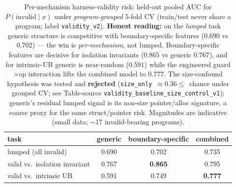 \begin{table}[t]
  \centering
  \caption{Per-mechanism harness-validity risk: held-out pooled AUC for
    $P(\mathrm{invalid}\mid x)$ under \emph{program-grouped} 5-fold CV
    (train/test never share a program; label \texttt{validity\_v2}).
    \textbf{Honest reading:} on the \emph{lumped} task generic structure is
    competitive with boundary-specific features ($0.690$ vs $0.702$) --- the
    win is \emph{per-mechanism}, not lumped. Boundary-specific features are
    decisive for isolation invariants ($0.865$ vs generic $0.767$), and for
    intrinsic-UB generic is near-random ($0.591$) while the engineered
    guard$\times$op interaction lifts the combined model to $0.777$. The
    size-confound hypothesis was tested and \textbf{rejected}
    (\texttt{size\_only}~$\approx0.36\le$~chance under grouped CV; see
    Table-source \texttt{validity\_baseline\_size\_control\_v1}); generic's
    residual lumped signal is its non-size pointer/alloc signature, a coarse
    proxy for the same struct/pointer risk. Magnitudes are indicative
    (small data; $\sim$17 invalid-bearing programs).}
  \label{tab:validity-auc}
  \begin{tabular}{lccc}
    \toprule
    task & generic & boundary-specific & combined \\
    \midrule
    lumped (all invalid)              & 0.690 & 0.702          & 0.735 \\
    valid vs.\ isolation invariant    & 0.767 & \textbf{0.865} & 0.795 \\
    valid vs.\ intrinsic UB           & 0.591 & 0.749          & \textbf{0.777} \\
    \bottomrule
  \end{tabular}
\end{table}


